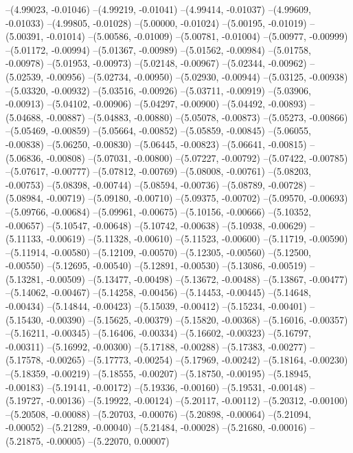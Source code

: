 --(4.99023, -0.01046)
--(4.99219, -0.01041)
--(4.99414, -0.01037)
--(4.99609, -0.01033)
--(4.99805, -0.01028)
--(5.00000, -0.01024)
--(5.00195, -0.01019)
--(5.00391, -0.01014)
--(5.00586, -0.01009)
--(5.00781, -0.01004)
--(5.00977, -0.00999)
--(5.01172, -0.00994)
--(5.01367, -0.00989)
--(5.01562, -0.00984)
--(5.01758, -0.00978)
--(5.01953, -0.00973)
--(5.02148, -0.00967)
--(5.02344, -0.00962)
--(5.02539, -0.00956)
--(5.02734, -0.00950)
--(5.02930, -0.00944)
--(5.03125, -0.00938)
--(5.03320, -0.00932)
--(5.03516, -0.00926)
--(5.03711, -0.00919)
--(5.03906, -0.00913)
--(5.04102, -0.00906)
--(5.04297, -0.00900)
--(5.04492, -0.00893)
--(5.04688, -0.00887)
--(5.04883, -0.00880)
--(5.05078, -0.00873)
--(5.05273, -0.00866)
--(5.05469, -0.00859)
--(5.05664, -0.00852)
--(5.05859, -0.00845)
--(5.06055, -0.00838)
--(5.06250, -0.00830)
--(5.06445, -0.00823)
--(5.06641, -0.00815)
--(5.06836, -0.00808)
--(5.07031, -0.00800)
--(5.07227, -0.00792)
--(5.07422, -0.00785)
--(5.07617, -0.00777)
--(5.07812, -0.00769)
--(5.08008, -0.00761)
--(5.08203, -0.00753)
--(5.08398, -0.00744)
--(5.08594, -0.00736)
--(5.08789, -0.00728)
--(5.08984, -0.00719)
--(5.09180, -0.00710)
--(5.09375, -0.00702)
--(5.09570, -0.00693)
--(5.09766, -0.00684)
--(5.09961, -0.00675)
--(5.10156, -0.00666)
--(5.10352, -0.00657)
--(5.10547, -0.00648)
--(5.10742, -0.00638)
--(5.10938, -0.00629)
--(5.11133, -0.00619)
--(5.11328, -0.00610)
--(5.11523, -0.00600)
--(5.11719, -0.00590)
--(5.11914, -0.00580)
--(5.12109, -0.00570)
--(5.12305, -0.00560)
--(5.12500, -0.00550)
--(5.12695, -0.00540)
--(5.12891, -0.00530)
--(5.13086, -0.00519)
--(5.13281, -0.00509)
--(5.13477, -0.00498)
--(5.13672, -0.00488)
--(5.13867, -0.00477)
--(5.14062, -0.00467)
--(5.14258, -0.00456)
--(5.14453, -0.00445)
--(5.14648, -0.00434)
--(5.14844, -0.00423)
--(5.15039, -0.00412)
--(5.15234, -0.00401)
--(5.15430, -0.00390)
--(5.15625, -0.00379)
--(5.15820, -0.00368)
--(5.16016, -0.00357)
--(5.16211, -0.00345)
--(5.16406, -0.00334)
--(5.16602, -0.00323)
--(5.16797, -0.00311)
--(5.16992, -0.00300)
--(5.17188, -0.00288)
--(5.17383, -0.00277)
--(5.17578, -0.00265)
--(5.17773, -0.00254)
--(5.17969, -0.00242)
--(5.18164, -0.00230)
--(5.18359, -0.00219)
--(5.18555, -0.00207)
--(5.18750, -0.00195)
--(5.18945, -0.00183)
--(5.19141, -0.00172)
--(5.19336, -0.00160)
--(5.19531, -0.00148)
--(5.19727, -0.00136)
--(5.19922, -0.00124)
--(5.20117, -0.00112)
--(5.20312, -0.00100)
--(5.20508, -0.00088)
--(5.20703, -0.00076)
--(5.20898, -0.00064)
--(5.21094, -0.00052)
--(5.21289, -0.00040)
--(5.21484, -0.00028)
--(5.21680, -0.00016)
--(5.21875, -0.00005)
--(5.22070, 0.00007)
